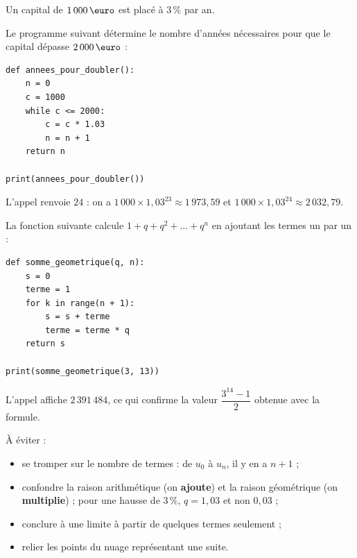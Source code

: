 \documentclass{poly}
\begin{document}
\begin{ex}
	Un capital de $1\,000\,\text{\euro}$ est placé à $3\,\%$ par an.

	Le programme suivant détermine le nombre d'années nécessaires pour que le capital dépasse $2\,000\,\text{\euro}$ :

	\begin{lstlisting}
def annees_pour_doubler():
    n = 0
    c = 1000
    while c <= 2000:
        c = c * 1.03
        n = n + 1
    return n

print(annees_pour_doubler())
\end{lstlisting}

	L'appel renvoie $24$ : on a $1\,000 \times 1{,}03^{23} \approx 1\,973{,}59$ et $1\,000 \times 1{,}03^{24} \approx 2\,032{,}79$.
\end{ex}

\begin{ex}
	La fonction suivante calcule $1 + q + q^2 + \dots + q^n$ en ajoutant les termes un par un :

	\begin{lstlisting}
def somme_geometrique(q, n):
    s = 0
    terme = 1
    for k in range(n + 1):
        s = s + terme
        terme = terme * q
    return s

print(somme_geometrique(3, 13))
\end{lstlisting}

	L'appel affiche $2\,391\,484$, ce qui confirme la valeur $\dfrac{3^{14} - 1}{2}$ obtenue avec la formule.
\end{ex}

\begin{erreur}
	À éviter :
	\begin{itemize}
		\item se tromper sur le nombre de termes : de $u_0$ à $u_n$, il y en a $n + 1$ ;
		\item confondre la raison arithmétique (on \textbf{ajoute}) et la raison géométrique (on \textbf{multiplie}) ; pour une hausse de $3\,\%$, $q = 1{,}03$ et non $0{,}03$ ;
		\item conclure à une limite à partir de quelques termes seulement ;
		\item relier les points du nuage représentant une suite.
	\end{itemize}
\end{erreur}
\end{document}
